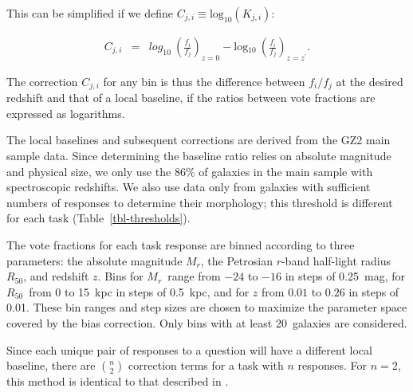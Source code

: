 \documentclass[useAMS,usenatbib]{mn2e}
\newcommand{\mr}{$M_r$}
\newcommand{\rfifty}{$R_{50}$}
\newcommand{\redshift}{$z$}
\begin{document}
\noindent This can be simplified if we define $C_{j,i}\equiv\text{log}_{10}(K_{j,i})$:

\begin{eqnarray}
C_{j,i} &=& \text{$log_{10}$}~\left(\frac{f_i}{f_j}\right)_{z=0} - \text{log$_{10}$}~\left(\frac{f_i}{f_j}\right)_{z=z^\prime}.
\label{eqnarray-adjprob4}
\end{eqnarray}

\noindent The correction $C_{j,i}$ for any bin is thus the difference between $f_i/f_j$ at the desired redshift and that of a local baseline, if the ratios between vote fractions are expressed as logarithms.  

The local baselines and subsequent corrections are derived from the GZ2 main sample data. Since determining the baseline ratio relies on absolute magnitude and physical size, we only use the 86\% of galaxies in the main sample with spectroscopic redshifts. We also use data only from galaxies with sufficient numbers of responses to determine their morphology; this threshold is different for each task (Table~\ref{tbl-thresholds}).  

The vote fractions for each task response are binned according to three parameters: the absolute magnitude \mr, the Petrosian $r$-band half-light radius \rfifty, and redshift $z$. Bins for \mr~range from $-24$ to $-16$ in steps of 0.25~mag, for \rfifty~from 0 to 15~kpc in steps of 0.5~kpc, and for $z$ from $0.01$ to $0.26$ in steps of 0.01. These bin ranges and step sizes are chosen to maximize the parameter space covered by the bias correction. Only bins with at least 20~galaxies are considered. %

Since each unique pair of responses to a question will have a different local baseline, there are $\binom{n}{2}$ correction terms for a task with $n$ responses. For $n=2$, this method is identical to that described in \citet{bam09}. 

\end{document}
